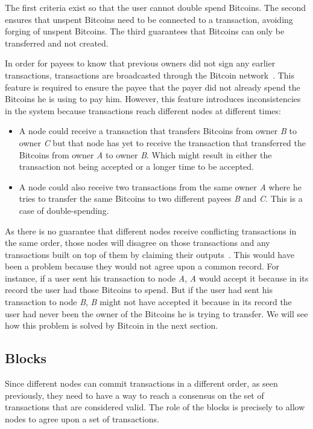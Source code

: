The first criteria exist so that the user cannot double spend Bitcoins. The second ensures that unspent Bitcoins need to be connected to a transaction, avoiding forging of unspent Bitcoins. The third guarantees that Bitcoins can only be transferred and not created.
 
In order for payees to know that previous owners did not sign any earlier transactions, transactions are broadcasted through the Bitcoin network~\cite{nakamoto2008bitcoin}. This feature is required to ensure the payee that the payer did not already spend the Bitcoins he is using to pay him. However, this feature introduces inconsistencies in the system because transactions reach different nodes at different times:
\begin{itemize}
    \item A node could receive a transaction that transfers Bitcoins from owner \textit{B} to owner \textit{C} but that node has yet to receive the transaction that transferred the Bitcoins from owner \textit{A} to owner \textit{B}. Which might result in either the transaction not being accepted or a longer time to be accepted.
    \item A node could also receive two transactions from the same owner \textit{A} where he tries to transfer the same Bitcoins to two different payees \textit{B} and \textit{C}. This is a case of double-spending.
\end{itemize}

As there is no guarantee that different nodes receive conflicting transactions in the same order, those nodes will disagree on those transactions and any transactions built on top of them by claiming their outputs~\cite{decker2013information}. This would have been a problem because they would not agree upon a common record. For instance, if a user sent his transaction to node \textit{A}, \textit{A} would accept it because in its record the user had those Bitcoins to spend. But if the user had sent his transaction to node \textit{B},  \textit{B} might not have accepted it because in its record the user had never been the owner of the Bitcoins he is trying to transfer. We will see how this problem is solved by Bitcoin in the next section.

\subsection{Blocks}
\label{sec:blocks}

Since different nodes can commit transactions in a different order, as seen previously, they need to have a way to reach a consensus on the set of transactions that are considered valid. The role of the blocks is precisely to allow nodes to agree upon a set of transactions.

